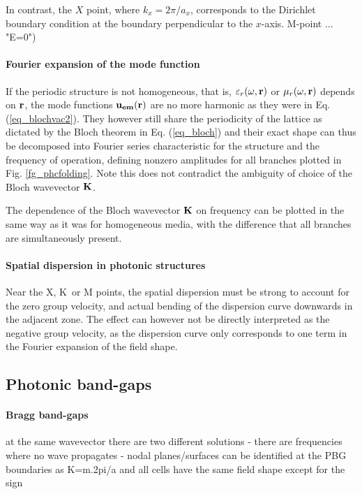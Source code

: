 In contrast, the $X$ point, where $k_x = 2\pi/a_x$, corresponds to the Dirichlet boundary condition at the boundary perpendicular to the $x$-axis.
M-point ... "E=0") %

\paragraph{Fourier expansion of the mode function}%
If the periodic structure is not homogeneous, that is, $\varepsilon_r(\omega,{\mathbf{r}})$ or $\mu_r(\omega,{\mathbf{r}})$ depends on ${\mathbf{r}}$, the mode functions $\mathbf{u_{em}}({\mathbf{r}})$ are no more harmonic as they were in Eq. (\ref{eq_blochvac2}). They  however still share the periodicity of the lattice as dictated by the Bloch theorem in Eq. (\ref{eq_bloch}) and their exact shape can thus be decomposed into Fourier series
characteristic for the structure and the frequency of operation, defining nonzero amplitudes for all branches plotted in Fig. \ref{fg_phcfolding}. Note this does not contradict the ambiguity of choice of the Bloch wavevector ${\mathbf{K}}$.

The dependence of the Bloch wavevector ${\mathbf{K}}$ on frequency can be plotted in the same way as it was for homogeneous media, with the difference that all branches are simultaneously present. %

\paragraph{Spatial dispersion in photonic structures} %
Near the X, K~or M points, the spatial dispersion must be strong to account for the zero group velocity, and actual bending of the dispersion curve downwards in the adjacent zone. The effect can however not be directly interpreted as the negative group velocity, as the dispersion curve only corresponds to one term in the Fourier expansion of the field shape.  
\subsection{Photonic band-gaps} %
\paragraph{Bragg band-gaps}%
at the same wavevector there are two different solutions - there are frequencies where no wave propagates - nodal planes/surfaces can be identified at the PBG boundaries as K=m.2pi/a and all cells have the same field shape except for the sign

